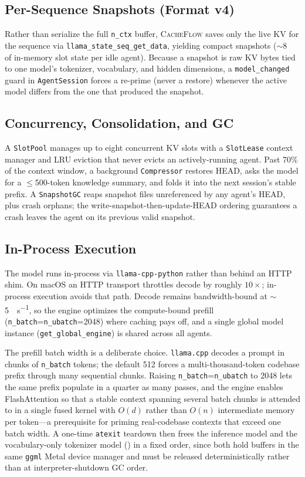 \documentclass[10pt]{article}
\begin{document}
\subsection{Per-Sequence Snapshots (Format v4)}
Rather than serialize the full \texttt{n\_ctx} buffer, \textsc{CacheFlow} saves
only the live KV for the sequence via \texttt{llama\_state\_seq\_get\_data},
yielding compact snapshots ($\sim$\SI{8}{\mega\byte} of in-memory slot state per
idle agent). Because a snapshot is raw KV bytes tied to one model's tokenizer,
vocabulary, and hidden dimensions, a \texttt{model\_changed} guard in
\texttt{AgentSession} forces a re-prime (never a restore) whenever the active
model differs from the one that produced the snapshot.

\subsection{Concurrency, Consolidation, and GC}
A \texttt{SlotPool} manages up to eight concurrent KV slots with a
\texttt{SlotLease} context manager and LRU eviction that never evicts an
actively-running agent. Past 70\% of the context window, a background
\texttt{Compressor} restores HEAD, asks the model for a $\leq$\num{500}-token
knowledge summary, and folds it into the next session's stable prefix. A
\texttt{SnapshotGC} reaps snapshot files unreferenced by any agent's HEAD, plus
crash orphans; the write-snapshot-then-update-HEAD ordering guarantees a crash
leaves the agent on its previous valid snapshot.

\subsection{In-Process Execution}
The model runs in-process via \texttt{llama-cpp-python} rather than behind an
HTTP shim. On macOS an HTTP transport throttles decode by roughly
$10\times$; in-process execution avoids that path. Decode remains
bandwidth-bound at $\sim$\SI{5}{\tokens\per\second}, so the engine optimizes the
compute-bound prefill (\texttt{n\_batch}=\texttt{n\_ubatch}=\num{2048}) where
caching pays off, and a single global model instance (\texttt{get\_global\_engine})
is shared across all agents.

The prefill batch width is a deliberate choice. \texttt{llama.cpp} decodes a
prompt in chunks of \texttt{n\_batch} tokens; the default 512 forces a
multi-thousand-token codebase prefix through many sequential chunks. Raising
\texttt{n\_batch}=\texttt{n\_ubatch} to \num{2048} lets the same prefix populate
in a quarter as many passes, and the engine enables FlashAttention so that a
stable context spanning several batch chunks is attended to in a single fused
kernel with $O(d)$ rather than $O(n)$ intermediate memory per token---a
prerequisite for priming real-codebase contexts that exceed one batch width. A
one-time \texttt{atexit} teardown then frees the inference model and the
vocabulary-only tokenizer model () in a fixed order, since
both hold buffers in the same \texttt{ggml} Metal device manager and must be
released deterministically rather than at interpreter-shutdown GC order.
\end{document}
